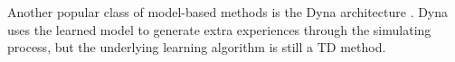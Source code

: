 Another popular class of model-based methods is the Dyna architecture \cite{Dyna}.
Dyna \cite{Dyna} uses the learned model to generate extra experiences through
the simulating process, but the underlying learning algorithm is still a TD method.




